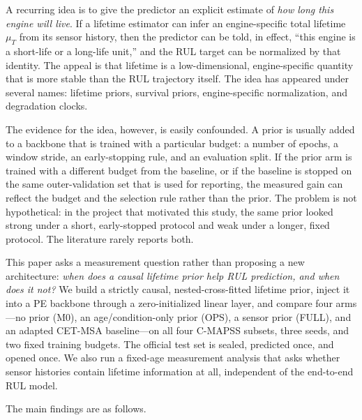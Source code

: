 \documentclass[journal]{IEEEtran}
\begin{document}
A recurring idea is to give the predictor an explicit estimate of \emph{how long this engine will live}. If a lifetime estimator can infer an engine-specific total lifetime $\mu_T$ from its sensor history, then the predictor can be told, in effect, ``this engine is a short-life or a long-life unit,'' and the RUL target can be normalized by that identity. The appeal is that lifetime is a low-dimensional, engine-specific quantity that is more stable than the RUL trajectory itself. The idea has appeared under several names: lifetime priors, survival priors, engine-specific normalization, and degradation clocks.

The evidence for the idea, however, is easily confounded. A prior is usually added to a backbone that is trained with a particular budget: a number of epochs, a window stride, an early-stopping rule, and an evaluation split. If the prior arm is trained with a different budget from the baseline, or if the baseline is stopped on the same outer-validation set that is used for reporting, the measured gain can reflect the budget and the selection rule rather than the prior. The problem is not hypothetical: in the project that motivated this study, the same prior looked strong under a short, early-stopped protocol and weak under a longer, fixed protocol. The literature rarely reports both.

This paper asks a measurement question rather than proposing a new architecture: \emph{when does a causal lifetime prior help RUL prediction, and when does it not?} We build a strictly causal, nested-cross-fitted lifetime prior, inject it into a PE backbone through a zero-initialized linear layer, and compare four arms---no prior (M0), an age/condition-only prior (OPS), a sensor prior (FULL), and an adapted CET-MSA baseline---on all four C-MAPSS subsets, three seeds, and two fixed training budgets. The official test set is sealed, predicted once, and opened once. We also run a fixed-age measurement analysis that asks whether sensor histories contain lifetime information at all, independent of the end-to-end RUL model.

The main findings are as follows.
\end{document}
